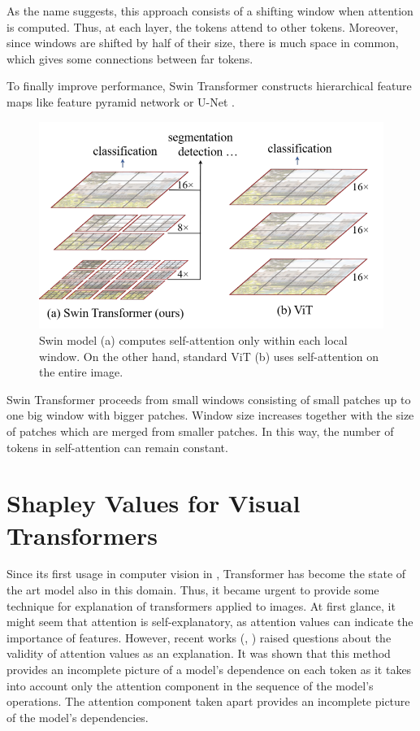\documentclass[magisterska,en]{pracamgr}
\begin{document}
As the name suggests, this approach consists of a shifting window when attention is computed. Thus, at each layer, the tokens attend to other tokens. Moreover, since windows are shifted by half of their size, there is much space in common, which gives some connections between far tokens.

To finally improve performance, Swin Transformer constructs hierarchical feature maps like feature pyramid network \cite{DBLP:conf/cvpr/LinDGHHB17} or U-Net \cite{DBLP:conf/miccai/RonnebergerFB15}.

\begin{figure}[H]
\centering
\includegraphics[scale=0.3]{./images/Swin_window.png}
\caption{Swin model (a) computes self-attention only within each local window. On the other hand, standard ViT (b) uses self-attention on the entire image.}
\end{figure}

Swin Transformer proceeds from small windows consisting of small patches up to one big window with bigger patches. Window size increases together with the size of patches which are merged from smaller patches. In this way, the number of tokens in self-attention can remain constant.







\chapter{Shapley Values for Visual Transformers}\label{r:visual_shap}
Since its first usage in computer vision in
\cite{DBLP:conf/iclr/DosovitskiyB0WZ21}, Transformer has become the state of the art model also in this domain. Thus, it became urgent to provide some technique for explanation of transformers applied to images. At first glance, it might seem that attention is self-explanatory, as attention values can indicate the importance of features. However, recent works (\cite{DBLP:conf/acl/SerranoS19},
\cite{DBLP:conf/cvpr/CheferGW21}) raised questions about the validity of attention values as an explanation. It was shown that this method provides an incomplete picture of a model's dependence on each token as it takes into account only the attention component in the sequence of the model's operations. The attention component taken apart provides an incomplete picture of the model's dependencies.
\end{document}
